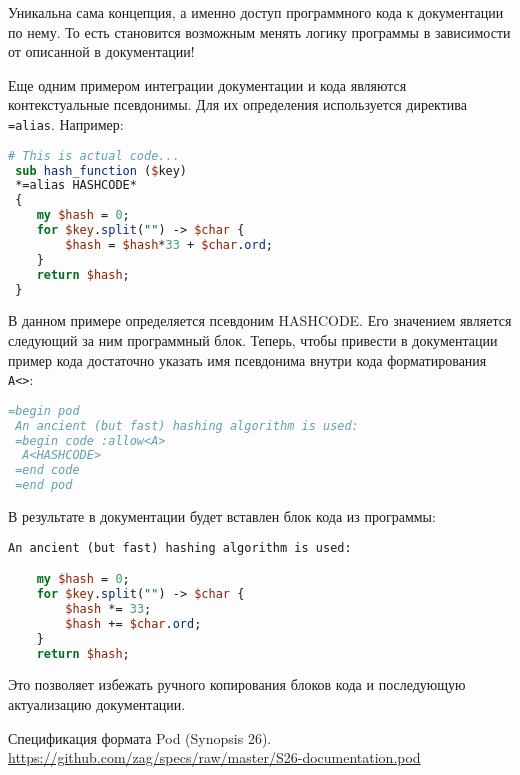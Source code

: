 \documentclass[10pt, a5paper]{article}
\begin{document}
Уникальна сама концепция, а именно доступ программного кода к
документации по нему. То есть становится возможным менять логику
программы в зависимости от описанной в документации!

Еще одним примером интеграции документации и кода являются
контекстуальные псевдонимы. Для их определения используется директива
\verb!=alias!. Например:
\begin{lstlisting}[language={Perl}]
 # This is actual code...
 sub hash_function ($key)
 *=alias HASHCODE*
 {
    my $hash = 0;
    for $key.split("") -> $char {
        $hash = $hash*33 + $char.ord;
    }
    return $hash;
 }
	   \end{lstlisting}

В данном примере определяется псевдоним HASHCODE. Его значением
является следующий за ним программный блок. Теперь, чтобы привести в
документации пример кода достаточно указать имя псевдонима внутри кода
форматирования \verb!A<>!:
\begin{lstlisting}[language={Perl}]
 =begin pod
 An ancient (but fast) hashing algorithm is used:
 =begin code :allow<A>
  A<HASHCODE>
 =end code
 =end pod
\end{lstlisting}

В результате в документации будет вставлен блок кода из программы:
\begin{lstlisting}[language={Perl}]
 An ancient (but fast) hashing algorithm is used:

    my $hash = 0;
    for $key.split("") -> $char {
        $hash *= 33;
        $hash += $char.ord;
    }
    return $hash;
	   \end{lstlisting}

Это позволяет избежать ручного копирования блоков кода и последующую
актуализацию документации.


\begin{thebibliography}{9}
	 Спецификация формата Pod (Synopsis 26). \url{https://github.com/zag/specs/raw/master/S26-documentation.pod}
\end{thebibliography}
\end{document}
